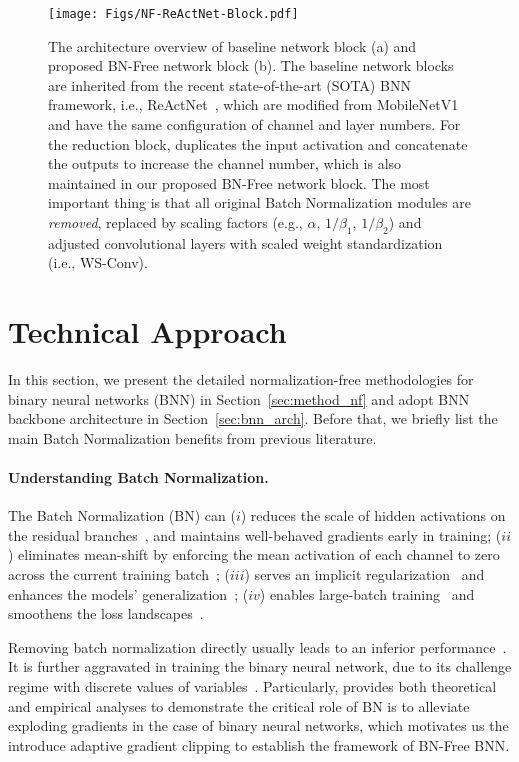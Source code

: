 \documentclass[final]{cvpr}
\begin{document}
\begin{figure*}[t] 
\centering
\texttt{[image: Figs/NF-ReActNet-Block.pdf]}
\caption{The architecture overview of baseline network block (a) and proposed BN-Free network block (b). The baseline network blocks are inherited from the recent state-of-the-art (SOTA) BNN framework, i.e., ReActNet~\cite{liu2020reactnet}, which are modified from MobileNetV1~\cite{howard2017mobilenets} and have the same configuration of channel and layer numbers. For the reduction block, \cite{liu2020reactnet} duplicates the input activation and concatenate the outputs to increase the channel number, which is also maintained in our proposed BN-Free network block. The most important thing is that all original Batch Normalization modules are \textit{removed}, replaced by scaling factors (e.g., $\alpha$, $1/\beta_1$, $1/\beta_2$) and adjusted convolutional layers with scaled weight standardization (i.e., WS-Conv).}
\label{fig:bfblock}
\end{figure*}

\section{Technical Approach}
In this section, we present the detailed normalization-free methodologies for binary neural networks (BNN) in Section~\ref{sec:method_nf} and adopt BNN backbone architecture in Section~\ref{sec:bnn_arch}. Before that, we briefly list the main Batch Normalization benefits from previous literature.

\paragraph{Understanding Batch Normalization.} The Batch Normalization (BN) can ($i$) reduces the scale of hidden activations on the residual branches~\cite{de2020batch,balduzzi2017shattered,hanin2018start,yang2019mean}, and maintains well-behaved gradients early in training; ($ii$) eliminates mean-shift by enforcing the mean activation of each channel to zero across the current training batch~\cite{de2020batch,DBLP,brock2021characterizing}; ($iii$) serves an implicit regularization~\cite{luo2018towards} and enhances the models' generalization~\cite{hoffer2017train}; ($iv$) enables large-batch training~\cite{goyal2017accurate} and smoothens the loss landscapes~\cite{santurkar2018does}. 

Removing batch normalization directly usually leads to an inferior performance~\cite{ioffe2015batch,brock2021agc}. It is further aggravated in training the binary neural network, due to its challenge regime with discrete values of variables~\cite{santurkar2018does}. Particularly, \cite{santurkar2018does} provides both theoretical and empirical analyses to demonstrate the critical role of BN is to alleviate exploding gradients in the case of binary neural networks, which motivates us the introduce adaptive gradient clipping to establish the framework of BN-Free BNN.
\end{document}
